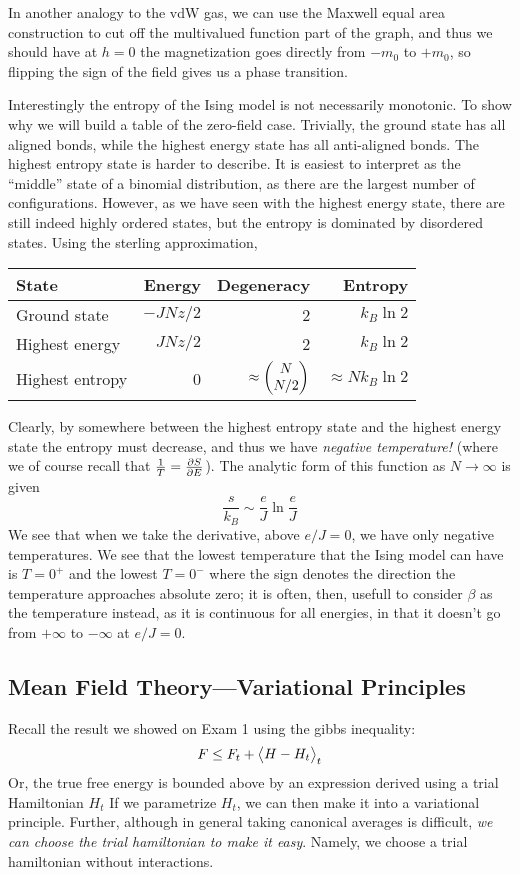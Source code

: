In another analogy to the vdW gas, we can use the Maxwell equal area construction to cut off the 
multivalued function part of the graph, and thus we should have at \(h=0\) the magnetization goes directly from \(-m_0\) to \(+m_0\), so flipping the sign of the field gives us a phase transition.

\begin{aside}
	Interestingly the entropy of the Ising model is not necessarily monotonic. To show why we will build a table of the zero-field case. Trivially, the ground state has all aligned bonds, while the highest energy state has all anti-aligned bonds. The highest entropy state is harder to describe. It is easiest to interpret as the ``middle'' state of a binomial distribution, as there are the largest number of configurations. However, as we have seen with the highest energy state, there are still indeed highly ordered states, but the entropy is dominated by disordered states. Using the sterling approximation, 
	\begin{center}
	\begin{tabular}{l|r|r|r}
		State & Energy & Degeneracy & Entropy\\
		\hline\hline
		Ground state& \(-JNz/2\) & 2 & \(k_B\ln 2\)\\
		\hline
		Highest energy & \(JNz/2\) & 2 & \(k_B\ln 2\)\\
		\hline
		Highest entropy & 0 & \(\approx\begin{pmatrix}N\\N/2\end{pmatrix}\) & \(\approx Nk_B\ln 2\)
	\end{tabular}
	\end{center}
	Clearly, by somewhere between the highest entropy state and the highest energy state the entropy must decrease, and thus we have \emph{negative temperature!} (where we of course recall that \(\frac{1}{T} = \frac{\partial S}{\partial E}\)). The analytic form of this function as \(N\to\infty\) is given
	\[\frac{s}{k_B} \sim \frac{e}{J}\ln \frac{e}{J}\]
	We see that when we take the derivative, above \(e/J=0\), we have only negative temperatures. We see that the lowest temperature that the Ising model can have is \(T=0^+\) and the lowest \(T=0^-\) where the sign denotes the direction the temperature approaches absolute zero; it is often, then, usefull to consider \(\beta\) as the temperature instead, as it is continuous for all energies, in that it doesn't go from \(+\infty\) to \(-\infty\) at \(e/J=0\).
\end{aside}

\subsection{Mean Field Theory---Variational Principles}
Recall the result we showed on Exam 1 using the gibbs inequality:
\begin{equation}
	F\leq F_t + \left\langle \begin{matrix}H-H_t\end{matrix} \right\rangle_t
\end{equation}
Or, the true free energy is bounded above by an expression derived using a trial Hamiltonian \(H_t\) If we parametrize \(H_t\), we can then make it into a variational principle. Further, although in general taking canonical averages is difficult, \emph{we can choose the trial hamiltonian to make it easy}. Namely, we choose a trial hamiltonian without interactions.


